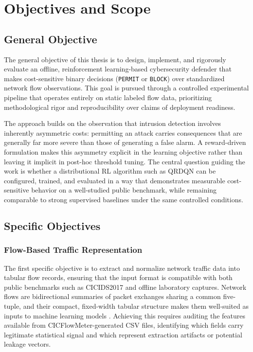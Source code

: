 \chapter{Objectives and Scope}

\section{General Objective}
The general objective of this thesis is to design, implement, and rigorously evaluate an offline, reinforcement learning-based cybersecurity defender that makes cost-sensitive binary decisions (\texttt{PERMIT} or \texttt{BLOCK}) over standardized network flow observations. This goal is pursued through a controlled experimental pipeline that operates entirely on static labeled flow data, prioritizing methodological rigor and reproducibility over claims of deployment readiness.

The approach builds on the observation that intrusion detection involves inherently asymmetric costs: permitting an attack carries consequences that are generally far more severe than those of generating a false alarm. A reward-driven formulation makes this asymmetry explicit in the learning objective rather than leaving it implicit in post-hoc threshold tuning. The central question guiding the work is whether a distributional RL algorithm such as QRDQN can be configured, trained, and evaluated in a way that demonstrates measurable cost-sensitive behavior on a well-studied public benchmark, while remaining comparable to strong supervised baselines under the same controlled conditions.

\section{Specific Objectives}

\subsection{Flow-Based Traffic Representation}
The first specific objective is to extract and normalize network traffic data into tabular flow records, ensuring that the input format is compatible with both public benchmarks such as CICIDS2017 and offline laboratory captures. Network flows are bidirectional summaries of packet exchanges sharing a common five-tuple, and their compact, fixed-width tabular structure makes them well-suited as inputs to machine learning models \parencite{Sperotto2010FlowIDS,Umer2017FlowIDS}. Achieving this requires auditing the features available from CICFlowMeter-generated CSV files, identifying which fields carry legitimate statistical signal and which represent extraction artifacts or potential leakage vectors.

